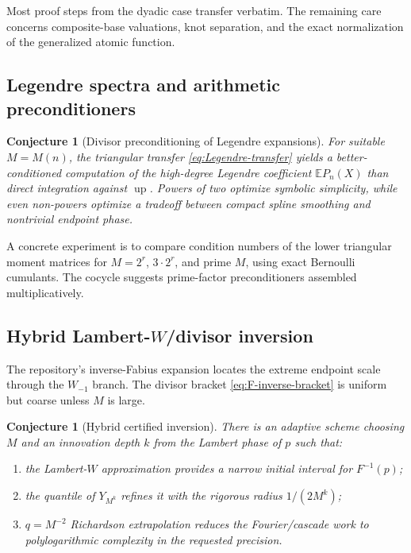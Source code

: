 \documentclass[11pt,oneside]{article}
\newtheorem{conjecture}[theorem]{Conjecture}
\theoremstyle{definition}
\theoremstyle{remark}
\newcommand{\Up}{\operatorname{up}}
\numberwithin{equation}{section}
\newcommand{\1}{\mathbf 1}
\begin{document}
Most proof steps from the dyadic case transfer verbatim.  The remaining care concerns
composite-base valuations, knot separation, and the exact normalization of the generalized
atomic function.

\subsection{Legendre spectra and arithmetic preconditioners}

\begin{conjecture}[Divisor preconditioning of Legendre expansions]
\label{conj:Legendre-preconditioner}
For suitable $M=M(n)$, the triangular transfer \eqref{eq:Legendre-transfer} yields a
better-conditioned computation of the high-degree Legendre coefficient
$\mathbb EP_n(X)$ than direct integration against $\Up$.  Powers of two optimize symbolic
simplicity, while even non-powers optimize a tradeoff between compact spline smoothing and
nontrivial endpoint phase.
\end{conjecture}

A concrete experiment is to compare condition numbers of the lower triangular moment
matrices for $M=2^r$, $3\cdot2^r$, and prime $M$, using exact Bernoulli cumulants.  The
cocycle suggests prime-factor preconditioners assembled multiplicatively.

\subsection{Hybrid Lambert-$W$/divisor inversion}

The repository's inverse-Fabius expansion locates the extreme endpoint scale through the
$W_{-1}$ branch.  The divisor bracket \eqref{eq:F-inverse-bracket} is uniform but coarse
unless $M$ is large.

\begin{conjecture}[Hybrid certified inversion]
\label{conj:hybrid-inverse}
There is an adaptive scheme choosing $M$ and an innovation depth $k$ from the Lambert
phase of $p$ such that:
\begin{enumerate}
\item the Lambert-$W$ approximation provides a narrow initial interval for $F^{-1}(p)$;
\item the quantile of $Y_{M^k}$ refines it with the rigorous radius $1/(2M^k)$;
\item $q=M^{-2}$ Richardson extrapolation reduces the Fourier/cascade work to
polylogarithmic complexity in the requested precision.
\end{enumerate}
\end{conjecture}
\end{document}
